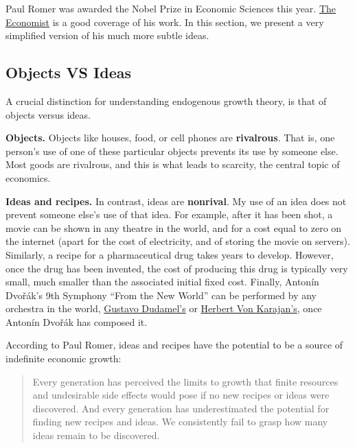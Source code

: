 \documentclass[]{book}
\begin{document}
Paul Romer was awarded the Nobel Prize in Economic Sciences this year.
\href{https://www.economist.com/finance-and-economics/2018/10/13/paul-romer-and-william-nordhaus-win-the-economics-nobel?fsrc=scn/fb/te/bl/ed/paulromerandwilliamnordhauswintheeconomicsnobelfreeexchange}{The
Economist} is a good coverage of his work. In this section, we present a
very simplified version of his much more subtle ideas.

\subsection{Objects VS Ideas}\label{objects-vs-ideas}

A crucial distinction for understanding endogenous growth theory, is
that of objects versus ideas.

\textbf{Objects.} Objects like houses, food, or cell phones are
\textbf{rivalrous}. That is, one person's use of one of these particular
objects prevents its use by someone else. Most goods are rivalrous, and
this is what leads to scarcity, the central topic of economics.

\textbf{Ideas and recipes.} In contrast, ideas are \textbf{nonrival}. My
use of an idea does not prevent someone else's use of that idea. For
example, after it has been shot, a movie can be shown in any theatre in
the world, and for a cost equal to zero on the internet (apart for the
cost of electricity, and of storing the movie on servers). Similarly, a
recipe for a pharmaceutical drug takes years to develop. However, once
the drug has been invented, the cost of producing this drug is typically
very small, much smaller than the associated initial fixed cost.
Finally, Antonín Dvořák's 9th Symphony ``From the New World'' can be
performed by any orchestra in the world,
\href{https://www.youtube.com/watch?v=vHqtJH2f1Yk}{Gustavo Dudamel's} or
\href{https://www.youtube.com/watch?v=0hmjGbh9qdg\&start_radio=1\&list=RD0hmjGbh9qdg\&t=193}{Herbert
Von Karajan's}, once Antonín Dvořák has composed it.

According to Paul Romer, ideas and recipes have the potential to be a
source of indefinite economic growth:

\begin{quote}
Every generation has perceived the limits to growth that finite
resources and undesirable side effects would pose if no new recipes or
ideas were discovered. And every generation has underestimated the
potential for finding new recipes and ideas. We consistently fail to
grasp how many ideas remain to be discovered.
\end{quote}
\end{document}
